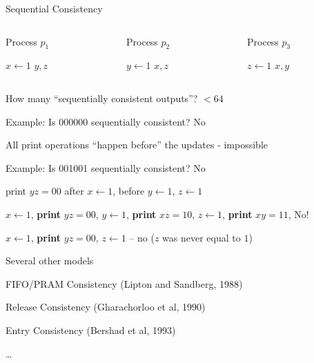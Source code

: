 \begin{frame}{Sequential Consistency}
\begin{columns}
\begin{column}{0.30\textwidth}	
\begin{Procedure}
\caption{Process $p_1$}
$x \gets 1$\;
\PRINT $y,z$
\end{Procedure}
\end{column}
\hfill
\begin{column}{0.30\textwidth}	
\begin{Procedure}
\caption{Process $p_2$}
$y \gets 1$\;
\PRINT $x,z$
\end{Procedure}
\end{column}
\hfill
\begin{column}{0.30\textwidth}	
\begin{Procedure}
\caption{Process $p_3$}
$z \gets 1$\;
\PRINT $x,y$
\end{Procedure}
\end{column}	
\end{columns}

\BIL	
\item How many “sequentially consistent outputs”? \pause $< 64$
\item  Example: Is 000000 sequentially consistent?  \pause No
	\BI
	\item All print operations “happen before” the updates - impossible
	\EI
\item Example: Is 001001 sequentially consistent? \pause No
\BI
\item print $yz=00$ after $x \gets 1$, before $y \gets 1$, $z \gets 1$
\item $x \gets 1$, \textbf{print} $yz=00$, $y \gets 1$, \textbf{print} $xz=10$, $z \gets 1$, \textbf{print} $xy=11$, No!
\item $x \gets 1$, \textbf{print} $yz=00$, $z \gets 1$ – no ($z$ was never equal to $1$)
\EI
\EIL

\end{frame}


\begin{frame}{Several other models}
\BIL
\item FIFO/PRAM Consistency	(Lipton and Sandberg, 1988)
\item Release Consistency		(Gharachorloo et al, 1990)
\item Entry Consistency			(Bershad et al, 1993)
\item \ldots
\EIL
\end{frame}

